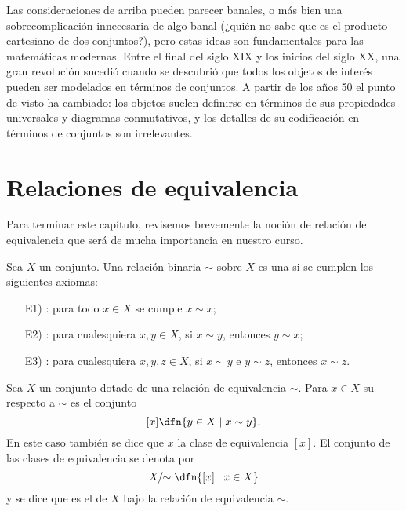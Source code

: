 Las consideraciones de arriba pueden parecer banales, o más bien una
sobrecomplicación innecesaria de algo banal (¿quién no sabe que es el producto
cartesiano de dos conjuntos?), pero estas ideas son fundamentales para las
matemáticas modernas. Entre el final del siglo XIX y los inicios del siglo XX,
una gran revolución sucedió cuando se descubrió que todos los objetos de interés
pueden ser modelados en términos de conjuntos. A partir de los años 50 el punto
de visto ha cambiado: los objetos suelen definirse en términos de sus
propiedades universales y diagramas conmutativos, y los detalles de su
codificación en términos de conjuntos son irrelevantes.


\section{Relaciones de equivalencia}
\label{sec:relaciones-de-equivalencia}

Para terminar este capítulo, revisemos brevemente la noción de relación de
equivalencia que será de mucha importancia en nuestro curso.

\begin{definicion}
  Sea $X$ un conjunto. Una relación binaria $\sim$ sobre $X$ es una
   si se cumplen
  los siguientes axiomas:
  \begin{enumerate}
  \item[E1)] : para todo $x\in X$
    se cumple $x\sim x$;

  \item[E2)] : para cualesquiera
    $x,y\in X$, si $x\sim y$, entonces $y\sim x$;

  \item[E3)] : para cualesquiera
    $x,y,z\in X$, si $x\sim y$ e $y\sim z$, entonces $x\sim z$.
  \end{enumerate}
\end{definicion}

\begin{definicion}
  Sea $X$ un conjunto dotado de una relación de equivalencia $\sim$. Para
  $x\in X$ su  respecto
  a $\sim$ es el conjunto
  $$[x] \dfn \{ y\in X \mid x\sim y \}.$$
  En este caso también se dice que $x$  la clase de
  equivalencia $[x]$. El conjunto de las clases de equivalencia se denota por
  $$X/\!\!\sim \dfn \{ [x] \mid x\in X \}$$
  y se dice que es el  de $X$ bajo la relación de
  equivalencia $\sim$.
\end{definicion}

